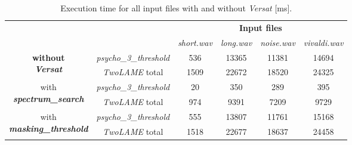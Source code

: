\begin{table}[H]
    \centering
    \begin{tabular}{|c|c|c|c|c|c|}
    \cline{3-6}
    \multicolumn{2}{c|}{}  & \multicolumn{4}{c|}{\textbf{Input files}} \\
    \cline{3-6}
    \multicolumn{2}{c|}{} & \textit{short.wav} & \textit{long.wav} & \textit{noise.wav} & \textit{vivaldi.wav} \\
    \hline
   \multirow{2}{*}{\parbox{2.5cm}{\centering \textbf{without} \\ \textbf{\textit{Versat}}}}  & \multicolumn{1}{c|}{\textit{psycho\_3\_threshold}}  & 536 & 13365 & 11381 & 14694 \\ 
    \cline{2-6}
    & \multicolumn{1}{|c|}{\textit{TwoLAME} total}  & 1509 & 22672 & 18520 & 24325\\ 
    \hline
    \multirow{2}{*}{\parbox{3.2cm}{\centering with \\ \textbf{\textit{spectrum\_search}}}}  & \multicolumn{1}{c|}{\textit{psycho\_3\_threshold}}  & 20 & 350 & 289 & 395 \\ 
    \cline{2-6}
    & \multicolumn{1}{|c|}{\textit{TwoLAME} total}  & 974 & 9391 & 7209 & 9729 \\ 
    \hline
    \multirow{2}{*}{\parbox{3.2cm}{\centering with \\ \textbf{\textit{masking\_threshold}}}}  & \multicolumn{1}{c|}{\textit{psycho\_3\_threshold}}  & 555 & 13807 & 11761 & 15168 \\ 
    \cline{2-6}
    & \multicolumn{1}{|c|}{\textit{TwoLAME} total}  & 1518 & 22677 & 18637 & 24458 \\ 
    \hline
    \end{tabular}
    \caption{Execution time for all input files with and without \textit{Versat} [ms].}
    \label{time}
\end{table}

